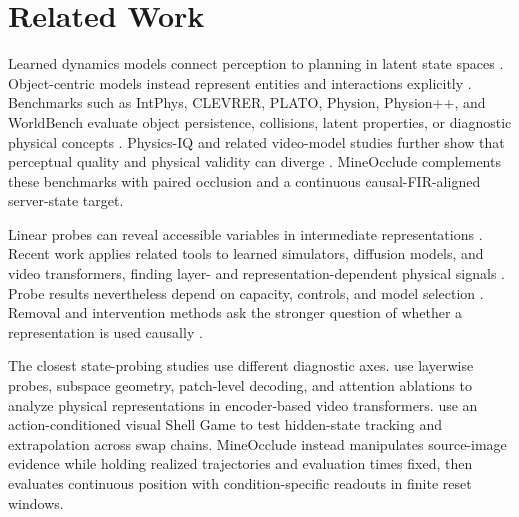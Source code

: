 \documentclass{article}
\begin{document}
\section{Related Work}

Learned dynamics models connect perception to planning in latent state spaces \citep{hafner2019planet,hafner2020dreamer,hafner2023mastering,schrittwieser2020muzero}. Object-centric models instead represent entities and interactions explicitly \citep{battaglia2016interaction,watters2017visual,kipf2020contrastive}. 
Benchmarks such as IntPhys, CLEVRER, PLATO, Physion, Physion++, and WorldBench evaluate object persistence, collisions, latent properties, or diagnostic physical concepts \citep{riochet2018intphys,yi2020clevrer,piloto2022intuitive,weihs2022benchmarking,tung2023physionpp,upadhyay2026worldbench, bear2021physion}. Physics-IQ and related video-model studies further show that perceptual quality and physical validity can diverge \citep{motamed2025generative,garrido2025intuitive,gu2025geco}. MineOcclude complements these benchmarks with paired occlusion and a continuous causal-FIR-aligned server-state target.

Linear probes can reveal accessible variables in intermediate representations \citep{alain2017understanding,li2023emergent,nanda2023emergent,shai2024transformers}. Recent work applies related tools to learned simulators, diffusion models, and video transformers, finding layer- and representation-dependent physical signals \citep{zhang2026whatdo,chen2023beyond,esmati2026invisible,joseph2026interpreting}. Probe results nevertheless depend on capacity, controls, and model selection \citep{hewitt2019designing,belinkov2022probing}. Removal and intervention methods ask the stronger question of whether a representation is used causally \citep{elazar2021amnesic,kim2018interpretability,geiger2024finding}.

The closest state-probing studies use different diagnostic axes. \citet{joseph2026interpreting} use layerwise probes, subspace geometry, patch-level decoding, and attention ablations to analyze physical representations in encoder-based video transformers. \citet{shin2026unobserved} use an action-conditioned visual Shell Game to test hidden-state tracking and extrapolation across swap chains. MineOcclude instead manipulates source-image evidence while holding realized trajectories and evaluation times fixed, then evaluates continuous position with condition-specific readouts in finite reset windows.
\end{document}

